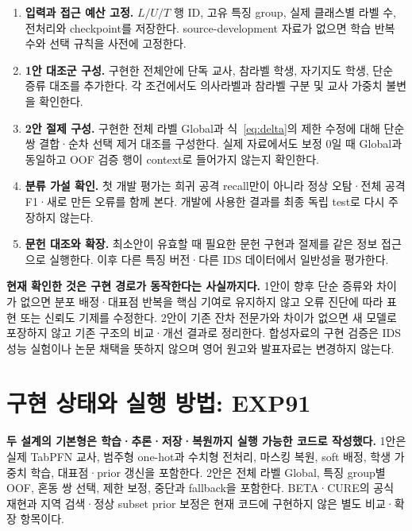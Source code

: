 \begin{enumerate}[leftmargin=*,itemsep=4pt]
\item \textbf{입력과 접근 예산 고정.} $L/U/T$ 행 ID, 고유 특징 group, 실제 클래스별 라벨 수, 전처리와 checkpoint를 저장한다. source-development 자료가 없으면 학습 반복 수와 선택 규칙을 사전에 고정한다.
\item \textbf{1안 대조군 구성.} 구현한 전체안에 단독 교사, 참라벨 학생, 자기지도 학생, 단순 증류 대조를 추가한다. 각 조건에서도 의사라벨과 참라벨 구분 및 교사 가중치 불변을 확인한다.
\item \textbf{2안 절제 구성.} 구현한 전체 라벨 Global과 식~\eqref{eq:delta}의 제한 수정에 대해 단순 쌍 결합·순차 선택 제거 대조를 구성한다. 실제 자료에서도 보정 0일 때 Global과 동일하고 OOF 검증 행이 context로 들어가지 않는지 확인한다.
\item \textbf{분류 가설 확인.} 첫 개발 평가는 희귀 공격 recall만이 아니라 정상 오탐·전체 공격 F1·새로 만든 오류를 함께 본다. 개발에 사용한 결과를 최종 독립 test로 다시 주장하지 않는다.
\item \textbf{문헌 대조와 확장.} 최소안이 유효할 때 필요한 문헌 구현과 절제를 같은 정보 접근으로 실행한다. 이후 다른 특징 버전·다른 IDS 데이터에서 일반성을 평가한다.
\end{enumerate}

\textbf{현재 확인한 것은 구현 경로가 동작한다는 사실까지다.} 1안이 향후 단순 증류와 차이가 없으면 분포 배정·대표점 반복을 핵심 기여로 유지하지 않고 오류 진단에 따라 표현 또는 신뢰도 기제를 수정한다. 2안이 기존 잔차 전문가와 차이가 없으면 새 모델로 포장하지 않고 기존 구조의 비교·개선 결과로 정리한다. 합성자료의 구현 검증은 IDS 성능 실험이나 논문 채택을 뜻하지 않으며 영어 원고와 발표자료는 변경하지 않는다.

\section{구현 상태와 실행 방법: EXP91}
\textbf{두 설계의 기본형은 학습·추론·저장·복원까지 실행 가능한 코드로 작성했다.} 1안은 실제 TabPFN 교사, 범주형 one-hot과 수치형 전처리, 마스킹 복원, soft 배정, 학생 가중치 학습, 대표점·prior 갱신을 포함한다. 2안은 전체 라벨 Global, 특징 group별 OOF, 혼동 쌍 선택, 제한 보정, 중단과 fallback을 포함한다. BETA·CURE의 공식 재현과 지역 검색·정상 subset prior 보정은 현재 코드에 구현하지 않은 별도 비교·확장 항목이다.

